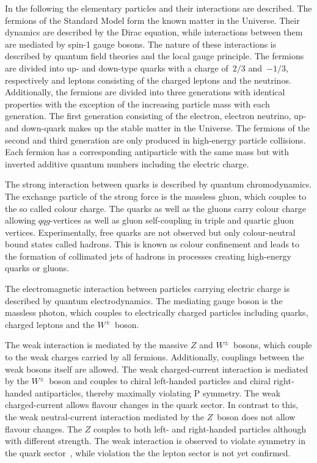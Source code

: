 In the following the elementary particles and their interactions are described.
The fermions of the Standard Model form the known matter in the Universe. Their
dynamics are described by the Dirac equation, while interactions between them
are mediated by spin-1 gauge bosons. The nature of these interactions is
described by quantum field theories and the local gauge principle. The fermions
are divided into up- and down-type quarks with a charge of~$2/3$ and~$-1/3$,
respectively and leptons consisting of the charged leptons and the neutrinos.
Additionally, the fermions are divided into three generations with identical
properties with the exception of the increasing particle mass with each
generation. The first generation consisting of the electron, electron neutrino,
up- and down-quark makes up the stable matter in the Universe. The fermions of
the second and third generation are only produced in high-energy particle
collisions. Each fermion has a corresponding antiparticle with the same mass but
with inverted additive quantum numbers including the electric charge.

The strong interaction between quarks is described by quantum chromodynamics.
The exchange particle of the strong force is the massless gluon, which couples
to the so called colour charge. The quarks as well as the gluons carry colour
charge allowing $qqg$-vertices as well as gluon self-coupling in triple and
quartic gluon vertices. Experimentally, free quarks are not observed but only
colour-neutral bound states called hadrons. This is known as colour confinement
and leads to the formation of collimated jets of hadrons in processes creating
high-energy quarks or gluons.

The electromagnetic interaction between particles carrying electric charge is
described by quantum electrodynamics. The mediating gauge boson is the massless
photon, which couples to electrically charged particles including quarks,
charged leptons and the $W^\pm$~boson.

The weak interaction is mediated by the massive $Z$ and $W^\pm$~bosons, which
couple to the weak charges carried by all fermions. Additionally, couplings
between the weak bosons itself are allowed. The weak charged-current interaction
is mediated by the $W^\pm$~boson and couples to chiral left-handed particles and
chiral right-handed antiparticles, thereby maximally violating $\text{P}$
symmetry. The weak charged-current allows flavour changes in the quark sector.
In contrast to this, the weak neutral-current interaction mediated by the
$Z$~boson does not allow flavour changes. The $Z$ couples to both left- and
right-handed particles although with different strength. The weak interaction is
observed to violate \cp symmetry in the quark
sector~\cite{cp_violation_quark_sector, cp_violation_quark_sector_2}, while \cp
violation the the lepton sector is not yet confirmed.


